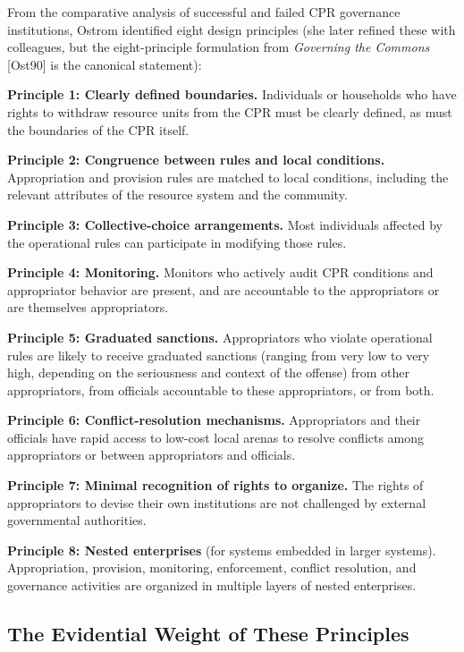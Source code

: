 \documentclass[12pt]{article}
\begin{document}
From the comparative analysis of successful and failed CPR governance
institutions, Ostrom identified eight design principles (she later
refined these with colleagues, but the eight-principle formulation from
\emph{Governing the Commons} {[}Ost90{]} is the canonical statement):

\textbf{Principle 1: Clearly defined boundaries.} Individuals or
households who have rights to withdraw resource units from the CPR must
be clearly defined, as must the boundaries of the CPR itself.

\textbf{Principle 2: Congruence between rules and local conditions.}
Appropriation and provision rules are matched to local conditions,
including the relevant attributes of the resource system and the
community.

\textbf{Principle 3: Collective-choice arrangements.} Most individuals
affected by the operational rules can participate in modifying those
rules.

\textbf{Principle 4: Monitoring.} Monitors who actively audit CPR
conditions and appropriator behavior are present, and are accountable to
the appropriators or are themselves appropriators.

\textbf{Principle 5: Graduated sanctions.} Appropriators who violate
operational rules are likely to receive graduated sanctions (ranging
from very low to very high, depending on the seriousness and context of
the offense) from other appropriators, from officials accountable to
these appropriators, or from both.

\textbf{Principle 6: Conflict-resolution mechanisms.} Appropriators and
their officials have rapid access to low-cost local arenas to resolve
conflicts among appropriators or between appropriators and officials.

\textbf{Principle 7: Minimal recognition of rights to organize.} The
rights of appropriators to devise their own institutions are not
challenged by external governmental authorities.

\textbf{Principle 8: Nested enterprises} (for systems embedded in larger
systems). Appropriation, provision, monitoring, enforcement, conflict
resolution, and governance activities are organized in multiple layers
of nested enterprises.

\subsection{The Evidential Weight of These Principles}\label{the-evidential-weight-of-these-principles}
\end{document}
